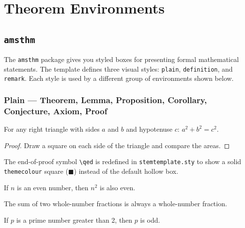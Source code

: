 \section{Theorem Environments}

	\subsection{\texttt{amsthm}}
	The \texttt{amsthm} package gives you styled boxes for presenting formal mathematical statements. The template defines three visual styles: \texttt{plain}, \texttt{definition}, and \texttt{remark}. Each style is used by a different group of environments shown below.
	
		\subsubsection{Plain --- Theorem, Lemma, Proposition, Corollary, Conjecture, Axiom, Proof}
		
		\begin{theorem}
			\label{thm:pythagorean}
			For any right triangle with sides $a$ and $b$ and hypotenuse $c$:
			$a^2 + b^2 = c^2$.
		\end{theorem}
		
		\begin{proof}
			Draw a square on each side of the triangle and compare the areas.
		\end{proof}
		
		The end-of-proof symbol \texttt{\textbackslash qed} is redefined in \texttt{stemtemplate.sty} to show a solid \texttt{themecolour} square (\textcolor{themecolour}{$\blacksquare$}) instead of the default hollow box.
		
		\begin{lemma}
			\label{lem:even}
			If $n$ is an even number, then $n^2$ is also even.
		\end{lemma}
		
		\begin{proposition}
			\label{prop:rational}
			The sum of two whole-number fractions is always a whole-number fraction.
		\end{proposition}
		
		\begin{corollary}
			\label{cor:prime}
			If $p$ is a prime number greater than 2, then $p$ is odd.
		\end{corollary}
		
